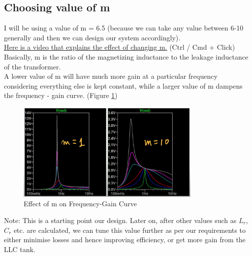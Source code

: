 \subsection{Choosing value of m}
I will be using a value of m = 6.5 (because we can take any value between 6-10 generally and then we can design our system accordingly).\\
\href{https://www.youtube.com/watch?v=qDT5xw1kgZs&t=391s}{Here is a video that explains the effect of changing m.} (Ctrl / Cmd + Click)\\
Basically, m is the ratio of the magnetizing inductance to the leakage inductance of the transformer.\\
A lower value of m will have much more gain at a particular frequency considering everything else is kept constant, while a larger value of m dampens the frequency - gain curve. (Figure \ref*{fig:m_effect})\\
\begin{figure}[H]
    \centering
    \includegraphics[width=0.8\textwidth]{images/m_effect.png}
    \caption{Effect of m on Frequency-Gain Curve}
    \label{fig:m_effect}
\end{figure}
\noindent
Note: This is a starting point our design. Later on, after other values such as $L_r$, $C_r$ etc. are calculated, we can tune this value further as per our requirements to either minimise losses and hence improving efficiency, or get more gain from the LLC tank.

